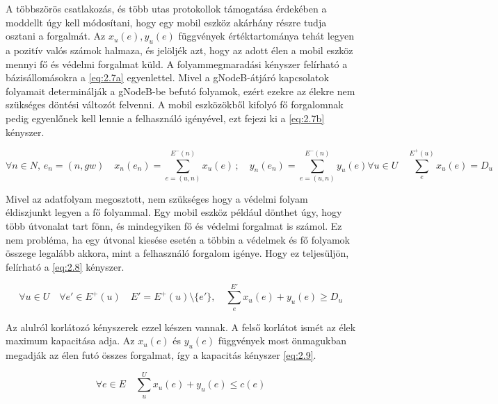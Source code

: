 \documentclass[a4paper,oneside]{article}
\newcommand{\inedge}[1]{E^-(#1)}
\newcommand{\outedge}[1]{E^+(#1)}
\begin{document}
A többszörös csatlakozás, és több utas protokollok támogatása érdekében a moddellt úgy kell módosítani,
hogy egy mobil eszköz akárhány részre tudja osztani a forgalmát.
Az $x_u(e), y_u(e)$ függvények értéktartománya tehát legyen a pozitív valós számok halmaza, és jelöljék azt,
hogy az adott élen a mobil eszköz mennyi fő és védelmi forgalmat küld.
A folyammegmaradási kényszer felírható a bázisállomásokra a \eqref{eq:2.7a} egyenlettel.
Mivel a gNodeB-átjáró kapcsolatok folyamait determinálják a gNodeB-be befutó folyamok,
ezért ezekre az élekre nem szükséges döntési változót felvenni.
A mobil eszközökből kifolyó fő forgalomnak pedig egyenlőnek kell lennie a felhasználó igényével,
ezt fejezi ki a \eqref{eq:2.7b} kényszer.

\begin{subequations}
  \begin{equation}
    \forall n \in N, \, e_{n} = (n, gw) \quad
    x_n(e_n) = \sum_{e=(u,n)}^{\inedge{n}} x_u(e) \,; \quad
    y_n(e_n) = \sum_{e=(u,n)}^{\inedge{n}} y_u(e) \label{eq:2.7a}
  \end{equation}
  \begin{equation}
    \forall u \in U \quad \sum_{e}^{\outedge{u}} x_u(e) = D_u \label{eq:2.7b}
  \end{equation}
\end{subequations}

Mivel az adatfolyam megosztott, nem szükséges hogy a védelmi folyam éldiszjunkt legyen a fő folyammal.
Egy mobil eszköz például dönthet úgy, hogy több útvonalat tart fönn, és mindegyiken fő és védelmi forgalmat is számol.
Ez nem probléma, ha egy útvonal kiesése esetén a többin a védelmek és fő folyamok összege legalább akkora, mint a felhasználó forgalom igénye.
Hogy ez teljesüljön, felírható a \eqref{eq:2.8} kényszer.

\begin{equation}
  \forall u \in U \quad \forall e' \in \outedge{u} \quad
  E' = \outedge{u} \setminus \lbrace e' \rbrace, \quad
  \sum_{e}^{E'} x_u(e) + y_u(e) \geq D_u \label{eq:2.8}
\end{equation}

Az alulról korlátozó kényszerek ezzel készen vannak. A felső korlátot ismét az élek maximum kapacitása adja.
Az $x_u(e)$ és $y_u(e)$ függvények most önmagukban megadják az élen futó összes forgalmat,
így a kapacitás kényszer \eqref{eq:2.9}.

\begin{equation}
  \forall e \in E \quad \sum_{u}^{U} x_u(e) + y_u(e) \leq c(e) \label{eq:2.9}
\end{equation}
\end{document}
